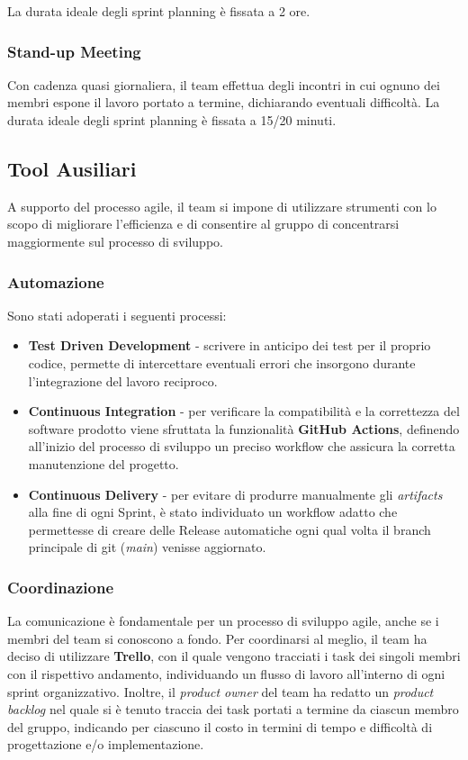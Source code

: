 La durata ideale degli sprint planning è fissata a 2 ore.

\subsubsection{Stand-up Meeting}
Con cadenza quasi giornaliera, il team effettua degli incontri in cui ognuno dei membri espone il lavoro portato a termine, dichiarando eventuali difficoltà.
La durata ideale degli sprint planning è fissata a 15/20 minuti.

\subsection{Tool Ausiliari}
A supporto del processo agile, il team si impone di utilizzare strumenti con lo scopo di migliorare l’efficienza e di consentire al gruppo di concentrarsi maggiormente sul processo di sviluppo.

\subsubsection{Automazione}
Sono stati adoperati i seguenti processi:
\begin{itemize}
    \item \textbf{Test Driven Development} - scrivere in anticipo dei test per il proprio codice, permette di intercettare eventuali errori che insorgono durante l'integrazione del lavoro reciproco.
    \item \textbf{Continuous Integration} - per verificare la compatibilità e la correttezza del software prodotto viene sfruttata la funzionalità \textbf{GitHub Actions}, definendo all'inizio del processo di sviluppo un preciso workflow che assicura la corretta manutenzione del progetto.
    \item \textbf{Continuous Delivery} - per evitare di produrre manualmente gli \textit{artifacts} alla fine di ogni Sprint, è stato individuato un workflow adatto che permettesse di creare delle Release automatiche ogni qual volta il branch principale di git (\textit{main}) venisse aggiornato.
\end{itemize}

\subsubsection{Coordinazione}
La comunicazione è fondamentale per un processo di sviluppo agile, anche se i membri del team si conoscono a fondo.
Per coordinarsi al meglio, il team ha deciso di utilizzare \textbf{Trello}, con il quale vengono tracciati i task dei singoli membri con il rispettivo andamento, individuando un flusso di lavoro all'interno di ogni sprint organizzativo. Inoltre, il \textit{product owner} del team ha redatto un \textit{product backlog} nel quale si è tenuto traccia dei task portati a termine da ciascun membro del gruppo, indicando per ciascuno il costo in termini di tempo e difficoltà di progettazione e/o implementazione.
